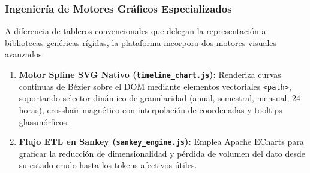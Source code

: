 \subsubsection{Ingeniería de Motores Gráficos Especializados}
A diferencia de tableros convencionales que delegan la representación a bibliotecas genéricas rígidas, la plataforma incorpora dos motores visuales avanzados:
\begin{enumerate}
  \item \textbf{Motor Spline SVG Nativo (\texttt{timeline\_chart.js}):} Renderiza curvas continuas de Bézier sobre el DOM mediante elementos vectoriales \texttt{<path>}, soportando selector dinámico de granularidad (anual, semestral, mensual, 24 horas), crosshair magnético con interpolación de coordenadas y tooltips glassmórficos.
  \item \textbf{Flujo ETL en Sankey (\texttt{sankey\_engine.js}):} Emplea Apache ECharts para graficar la reducción de dimensionalidad y pérdida de volumen del dato desde su estado crudo hasta los tokens afectivos útiles.
\end{enumerate}
